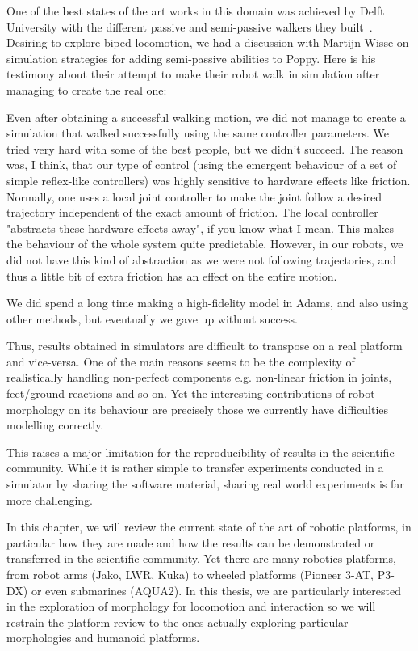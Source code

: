 One of the best states of the art works in this domain was achieved by Delft University with the different passive and semi-passive walkers they built~\parencite{wisse2005three}. Desiring to explore biped locomotion, we had a discussion with Martijn Wisse on simulation strategies for adding semi-passive abilities to Poppy. Here is his testimony about their attempt to make their robot walk in simulation after managing to create the real one:

\begin{formal}

Even after obtaining a successful walking motion, we did not manage to create a simulation that walked successfully using the same controller parameters. We tried very hard with some of the best people, but we didn’t succeed. The reason was, I think, that our type of control (using the emergent behaviour of a set of simple reflex-like controllers) was highly sensitive to hardware effects like friction. Normally, one uses a local joint controller to make the joint follow a desired trajectory independent of the exact amount of friction. The local controller "abstracts these hardware effects away", if you know what I mean. This makes the behaviour of the whole system quite predictable. However, in our robots, we did not have this kind of abstraction as we were not following trajectories, and thus a little bit of extra friction has an effect on the entire motion.

We did spend a long time making a high-fidelity model in Adams, and also using other methods, but eventually we gave up without success.

\end{formal}

Thus, results obtained in simulators are difficult to transpose on a real platform and vice-versa. One of the main reasons seems to be the complexity of realistically handling non-perfect components e.g. non-linear friction in joints, feet/ground reactions and so on. Yet the interesting contributions of robot morphology on its behaviour are precisely those we currently have difficulties modelling correctly.

This raises a major limitation for the reproducibility of results in the scientific community. While it is rather simple to transfer experiments conducted in a simulator by sharing the software material, sharing real world experiments is far more challenging.

In this chapter, we will review the current state of the art of robotic platforms, in particular how they are made and how the results can be demonstrated or transferred in the scientific community. Yet there are many robotics platforms, from robot arms (Jako, LWR, Kuka) to wheeled platforms (Pioneer 3-AT, P3-DX) or even submarines (AQUA2). In this thesis, we are particularly interested in the exploration of morphology for locomotion and interaction so we will restrain the platform review to the ones actually exploring particular morphologies and humanoid platforms.


